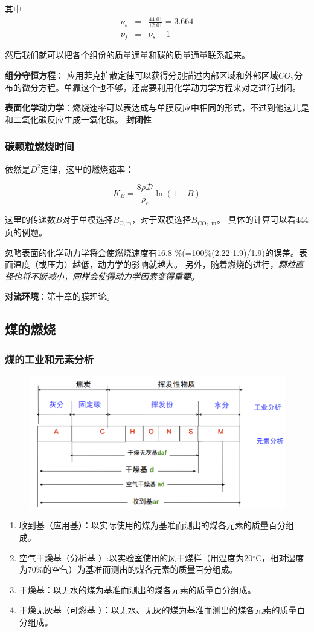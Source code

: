 其中
\begin{eqnarray}
    \nu_s &=& \frac{44.01}{12.01} = 3.664\\
    \nu_f &=& \nu_s - 1
\end{eqnarray}

然后我们就可以把各个组份的质量通量和碳的质量通量联系起来。

\textbf{组分守恒方程}：
应用菲克扩散定律可以获得分别描述内部区域和外部区域\(CO_\mathrm{2}\)分布的微分方程。单靠这个也不够，还需要利用化学动力学方程来对之进行封闭。

\textbf{表面化学动力学}：燃烧速率可以表达成与单膜反应中相同的形式，不过到他这儿是和二氧化碳反应生成一氧化碳。
\textbf{封闭性}

\subsubsection{碳颗粒燃烧时间}
依然是\(D^2\)定律，这里的燃烧速率：

\begin{equation}
    K_B = \frac{8\rho \mathcal{D}}{\rho_c}\ln(1+B)
\end{equation}

这里的传递数\(B\)对于单模选择\(B_\mathrm{O,m}\)，对于双模选择\(B_\mathrm{CO_2, m}\)。
具体的计算可以看444页的例题。

忽略表面的化学动力学将会使燃烧速度有16.8 \%(=100\%(2.22-1.9)/1.9)的误差。表面温度（或压力）越低，动力学的影响就越大。 另外，随着燃烧的进行，\textit{颗粒直径也将不断减小，同样会使得动力学因素变得重要}。

\textbf{对流环境}：第十章的膜理论。

\subsection{煤的燃烧}
\subsubsection{煤的工业和元素分析}
\begin{figure}
    \centering
    \includegraphics[width=.3\textwidth]{img/coal.png}
\end{figure}
\begin{enumerate}
    \item 收到基（应用基）：以实际使用的煤为基准而测出的煤各元素的质量百分组成。
    \item 空气干燥基（分析基 ）:以实验室使用的风干煤样（用温度为20\(^\circ\)C，相对湿度为70\%的空气）为基准而测出的煤各元素的质量百分组成。
    \item 干燥基：以无水的煤为基准而测出的煤各元素的质量百分组成。
    \item 干燥无灰基（可燃基 ）：以无水、无灰的煤为基准而测出的煤各元素的质量百分组成。
\end{enumerate}

